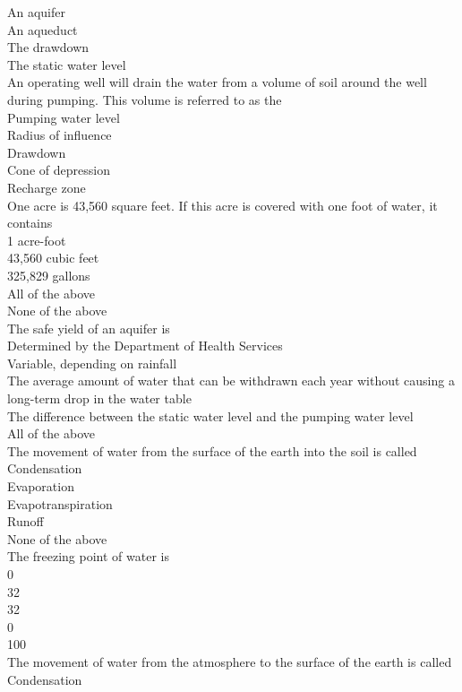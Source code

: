 An aquifer\\
An aqueduct\\
The drawdown\\
The static water level\\
An operating well will drain the water from a volume of soil around the well during pumping. This volume is referred to as the\\
Pumping water level\\
Radius of influence\\
Drawdown\\
Cone of depression\\
Recharge zone\\
One acre is 43,560 square feet. If this acre is covered with one foot of water, it contains\\
1 acre-foot\\
43,560 cubic feet\\
325,829 gallons\\
All of the above\\
None of the above\\
The safe yield of an aquifer is\\
Determined by the Department of Health Services\\
Variable, depending on rainfall\\
The average amount of water that can be withdrawn each year without causing a long-term drop in the water table\\
The difference between the static water level and the pumping water level\\
All of the above\\
The movement of water from the surface of the earth into the soil is called\\
Condensation\\
Evaporation\\
Evapotranspiration\\
Runoff\\
None of the above\\
The freezing point of water is\\
0\\
32\\
32\\
0\\
100\\
The movement of water from the atmosphere to the surface of the earth is called\\
Condensation\\

